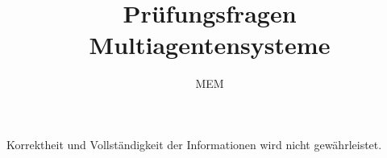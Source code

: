 \documentclass{article} %
\title{Prüfungsfragen Multiagentensysteme}
\author{
	MEM
}
\begin{document}
\maketitle
\begin{framed}
	Korrektheit und Vollständigkeit der Informationen wird nicht gewährleistet.
\end{framed}












\end{document}

